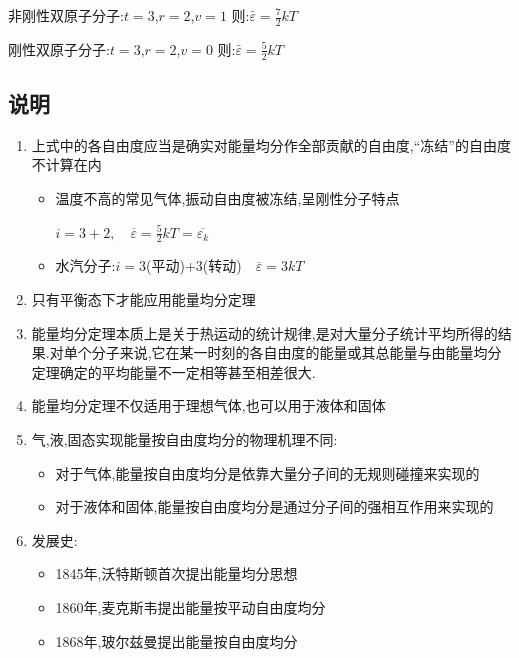 \documentclass{article}
\begin{document}
\quad 非刚性双原子分子:$t = 3$,$r = 2$,$v = 1$ 则:$\bar{\varepsilon} = \frac{7}{2} kT$

\quad 刚性双原子分子:$t = 3$,$r = 2$,$v = 0$ 则:$\bar{\varepsilon} = \frac{5}{2} kT$

\subsection{说明}

\begin{enumerate}

\item 上式中的各自由度应当是确实对能量均分作全部贡献的自由度,“冻结”的自由度不计算在内

\begin{itemize}

    \item 温度不高的常见气体,振动自由度被冻结,呈刚性分子特点
    
    $ i=3+2,\quad\overline{\varepsilon}=\frac{5}{2}kT=\overline{\varepsilon_k}$

    \item 水汽分子:$i=3$(平动)+$3$(转动)$\quad\overline{\varepsilon}=3kT$
\end{itemize}

\item 只有平衡态下才能应用能量均分定理
\item 能量均分定理本质上是关于热运动的统计规律,是对大量分子统计平均所得的结果.对单个分子来说,它在某一时刻的各自由度的能量或其总能量与由能量均分定理确定的平均能量不一定相等甚至相差很大.
\item 能量均分定理不仅适用于理想气体,也可以用于液体和固体
\item 气,液,固态实现能量按自由度均分的物理机理不同:
\begin{itemize}
    \item 对于气体,能量按自由度均分是依靠大量分子间的无规则碰撞来实现的
    \item 对于液体和固体,能量按自由度均分是通过分子间的强相互作用来实现的
\end{itemize} 

\item 发展史:
\begin{itemize}
    \item 1845年,沃特斯顿首次提出能量均分思想
    \item 1860年,麦克斯韦提出能量按平动自由度均分
    \item 1868年,玻尔兹曼提出能量按自由度均分
\end{itemize}


\end{enumerate}
\end{document}
